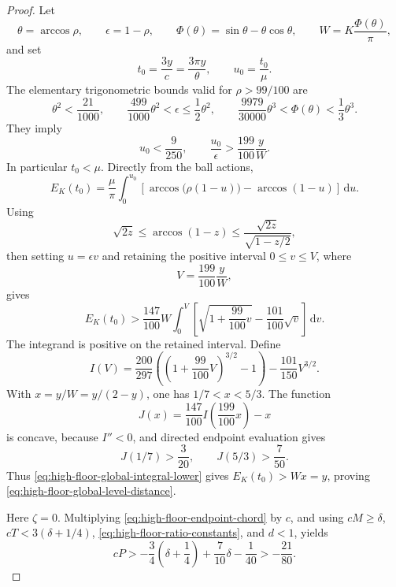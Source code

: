 \documentclass[11pt]{article}
\theoremstyle{remark}
\newcommand{\dd}{\,\mathrm d}
\begin{document}
\begin{proof}
Let
\[
 \theta=\arccos\rho,\qquad \epsilon=1-\rho,
 \qquad \Phi(\theta)=\sin\theta-\theta\cos\theta,
 \qquad W=K\frac{\Phi(\theta)}\pi,
\]
and set
\[
 t_0=\frac{3y}{c}=\frac{3\pi y}{\theta},
 \qquad u_0=\frac{t_0}{\mu}.
\]
The elementary trigonometric bounds valid for
$\rho>99/100$ are
\begin{equation}
 \theta^2<\frac{21}{1000},\qquad
 \frac{499}{1000}\theta^2<\epsilon\leq\frac12\theta^2,
 \qquad
 \frac{9979}{30000}\theta^3<\Phi(\theta)<\frac13\theta^3.
 \label{eq:high-floor-global-trig}
\end{equation}
They imply
\begin{equation}
 u_0<\frac9{250},\qquad
 \frac{u_0}{\epsilon}>
 \frac{199}{100}\frac yW.
 \label{eq:high-floor-global-u-zero}
\end{equation}
In particular $t_0<\mu$.  Directly from the ball actions,
\begin{equation}
 E_K(t_0)=\frac\mu\pi\int_0^{u_0}
 \left[
 \arccos\bigl(\rho(1-u)\bigr)-\arccos(1-u)
 \right]\dd u.
 \label{eq:high-floor-global-increment}
\end{equation}
Using
\[
 \sqrt{2z}\leq\arccos(1-z)
 \leq\frac{\sqrt{2z}}{\sqrt{1-z/2}},
\]
then setting $u=\epsilon v$ and retaining the positive interval
$0\leq v\leq V$, where
\[
 V=\frac{199}{100}\frac yW,
\]
gives
\begin{equation}
 E_K(t_0)>
 \frac{147}{100}W\int_0^V
 \left[
 \sqrt{1+\frac{99}{100}v}-\frac{101}{100}\sqrt v
 \right]\dd v.
 \label{eq:high-floor-global-integral-lower}
\end{equation}
The integrand is positive on the retained interval.  Define
\[
 I(V)=\frac{200}{297}
 \left(\left(1+\frac{99}{100}V\right)^{3/2}-1\right)
 -\frac{101}{150}V^{3/2}.
\]
With $x=y/W=y/(2-y)$, one has $1/7<x<5/3$.  The function
\[
 J(x)=\frac{147}{100}I\left(\frac{199}{100}x\right)-x
\]
is concave, because $I''<0$, and directed endpoint evaluation gives
\begin{equation}
 J(1/7)>\frac3{20},\qquad J(5/3)>\frac7{50}.
 \label{eq:high-floor-global-J-margins}
\end{equation}
Thus \eqref{eq:high-floor-global-integral-lower} gives
$E_K(t_0)>Wx=y$, proving
\eqref{eq:high-floor-global-level-distance}.

Here $\zeta=0$.  Multiplying
\eqref{eq:high-floor-endpoint-chord} by $c$, and using
$cM\geq\delta$, $cT<3(\delta+1/4)$,
\eqref{eq:high-floor-ratio-constants}, and $d<1$, yields
\begin{equation}
 cP>
 -\frac34\left(\delta+\frac14\right)
 +\frac7{10}\delta-\frac1{40}
 >-\frac{21}{80}.
 \label{eq:high-floor-global-prefix-margin}
\end{equation}


\end{proof}
\end{document}
